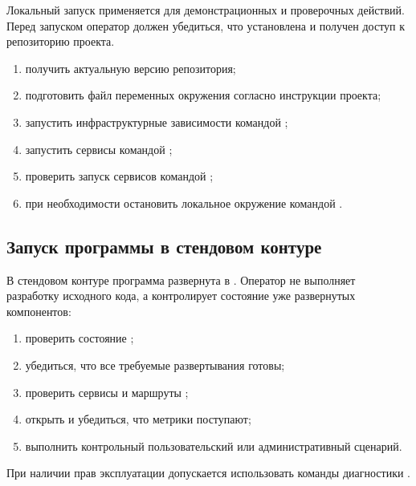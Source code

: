 \documentclass[12pt,a4paper]{extarticle}
\begin{document}
\begin{hseExample}
Локальный запуск применяется для демонстрационных и проверочных действий. Перед запуском оператор должен убедиться, что установлена  и получен доступ к репозиторию проекта.

\begin{enumerate}[label=\arabic*), leftmargin=1.25cm]
    \item получить актуальную версию репозитория;
    \item подготовить файл переменных окружения согласно инструкции проекта;
    \item запустить инфраструктурные зависимости командой ;
    \item запустить сервисы командой ;
    \item проверить запуск сервисов командой ;
    \item при необходимости остановить локальное окружение командой .
\end{enumerate}
\end{hseExample}

\subsection{Запуск программы в стендовом контуре}

\begin{hseExample}
В стендовом контуре программа развернута в . Оператор не выполняет разработку исходного кода, а контролирует состояние уже развернутых компонентов:

\begin{enumerate}[label=\arabic*), leftmargin=1.25cm]
    \item проверить состояние ;
    \item убедиться, что все требуемые развертывания готовы;
    \item проверить сервисы и маршруты ;
    \item открыть  и убедиться, что метрики поступают;
    \item выполнить контрольный пользовательский или административный сценарий.
\end{enumerate}

При наличии прав эксплуатации допускается использовать команды диагностики .
\end{hseExample}
\end{document}
